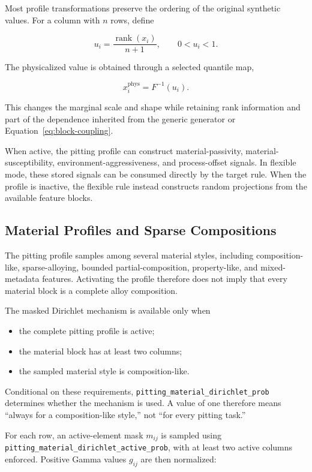 \documentclass{article}
\begin{document}
Most profile transformations preserve the ordering of the original synthetic values. For a column with \(n\) rows, define

\[
u_i=\frac{\operatorname{rank}(x_i)}{n+1},
\qquad 0<u_i<1.
\]

The physicalized value is obtained through a selected quantile map,

\[
x_i^{\mathrm{phys}}=F^{-1}(u_i).
\]

This changes the marginal scale and shape while retaining rank information and part of the dependence inherited from the generic generator or Equation~\eqref{eq:block-coupling}.

When active, the pitting profile can construct material-passivity, material-susceptibility, environment-aggressiveness, and process-offset signals. In flexible mode, these stored signals can be consumed directly by the target rule. When the profile is inactive, the flexible rule instead constructs random projections from the available feature blocks.

\subsection{Material Profiles and Sparse Compositions}

The pitting profile samples among several material styles, including composition-like, sparse-alloying, bounded partial-composition, property-like, and mixed-metadata features. Activating the profile therefore does not imply that every material block is a complete alloy composition.

The masked Dirichlet mechanism is available only when

\begin{itemize}
    \item the complete pitting profile is active;
    \item the material block has at least two columns;
    \item the sampled material style is composition-like.
\end{itemize}

Conditional on these requirements,
\texttt{pitting\_material\_dirichlet\_prob} determines whether the mechanism is used. A value of one therefore means ``always for a composition-like style,'' not ``for every pitting task.''

For each row, an active-element mask \(m_{ij}\) is sampled using
\texttt{pitting\_material\_dirichlet\_active\_prob}, with at least two active columns enforced. Positive Gamma values \(g_{ij}\) are then normalized:
\end{document}
